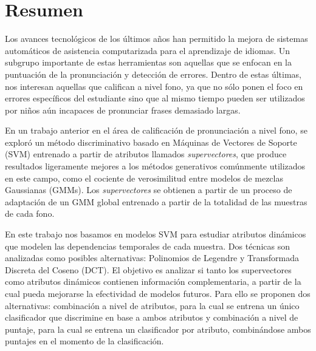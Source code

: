 \chapter*{Resumen}

Los avances tecnológicos de los últimos años han permitido la mejora de sistemas
automáticos de asistencia computarizada para el aprendizaje de idiomas.
Un subgrupo importante de estas herramientas son aquellas que se enfocan en la
puntuación de la pronunciación y detección de errores.
Dentro de estas últimas, nos interesan
aquellas que califican a nivel fono, ya que
no sólo ponen el foco en errores específicos del estudiante sino que al mismo tiempo
pueden ser utilizados por niños aún incapaces de pronunciar frases
demasiado largas.


En un trabajo anterior en el área de calificación de pronunciación a nivel fono,
se exploró
un método discriminativo basado en Máquinas de Vectores de Soporte (SVM) entrenado
a partir de atributos llamados \textit{supervectores},
que produce resultados ligeramente mejores a los métodos
generativos comúnmente utilizados en este campo, como el cociente de verosimilitud
entre modelos de mezclas Gaussianas (GMMs). Los \textit{supervectores} se obtienen a partir de
un proceso de adaptación de un GMM global entrenado a partir de la totalidad
de las muestras de cada fono.

En este trabajo nos basamos en modelos SVM para
estudiar atributos dinámicos que modelen las dependencias
temporales de cada muestra. Dos técnicas son analizadas como posibles alternativas:
Polinomios de Legendre y Transformada Discreta del Coseno (DCT).
El objetivo
es analizar si tanto los supervectores como atributos dinámicos
contienen información complementaria,
a partir de la cual pueda mejorarse la efectividad de modelos futuros.
Para ello
se proponen dos alternativas: combinación a nivel de atributos,
para la cual se entrena un único clasificador que discrimine en base a ambos atributos
y combinación a nivel de puntaje,
para la cual se entrena un clasificador por atributo, combinándose ambos puntajes
en el momento de la clasificación.


